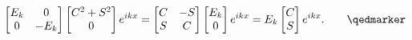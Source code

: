 {\begin{dmath}
\begin{bmatrix}
E_k & 0 \\
0 & -E_k
\end{bmatrix}
\begin{bmatrix}
C^2 + S^2 \\
0 \\
\end{bmatrix}
e^{i k x}
=
\begin{bmatrix}
C & - S \\
S & C
\end{bmatrix}
\begin{bmatrix}
E_k \\
0
\end{bmatrix}
e^{i k x}
=
E_k
\begin{bmatrix}
C \\
S
\end{bmatrix}
e^{i k x}. \qquad \qedmarker
\end{dmath}

}
